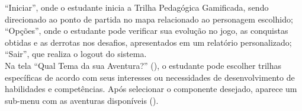 “Iniciar”, onde o estudante inicia a Trilha Pedagógica Gamificada, sendo direcionado ao ponto de partida no mapa relacionado ao personagem escolhido;
\\

“Opções”, onde o estudante pode verificar sua evolução no jogo, as conquistas obtidas e as derrotas nos desafios, apresentados em um relatório personalizado;
\\

“Sair”, que realiza o logout do sistema.
\\

Na tela “Qual Tema da sua Aventura?” (), o estudante pode escolher trilhas específicas de acordo com seus interesses ou necessidades de desenvolvimento de habilidades e competências. Após selecionar o componente desejado, aparece um sub-menu com as aventuras disponíveis ().
\\

